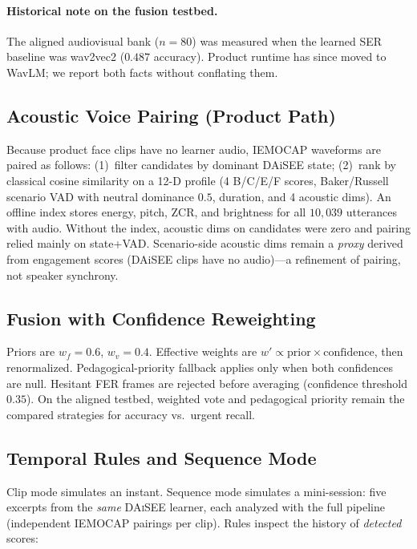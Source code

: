 \documentclass[conference]{IEEEtran}
\begin{document}
\paragraph{Historical note on the fusion testbed.}
The aligned audiovisual bank ($n{=}80$) was measured when the learned SER
baseline was wav2vec2 ($0.487$ accuracy). Product runtime has since moved to
WavLM; we report both facts without conflating them.

\subsection{Acoustic Voice Pairing (Product Path)}
\label{sec:pair}

Because product face clips have no learner audio, IEMOCAP waveforms are paired
as follows: (1)~filter candidates by dominant DAiSEE state; (2)~rank by
classical cosine similarity on a 12-D profile (4 B/C/E/F scores, Baker/Russell
scenario VAD with neutral dominance $0.5$, duration, and 4 acoustic dims). An
offline index stores energy, pitch, ZCR, and brightness for all $10{,}039$
utterances with audio. Without the index, acoustic dims on candidates were
zero and pairing relied mainly on state+VAD. Scenario-side acoustic dims remain
a \emph{proxy} derived from engagement scores (DAiSEE clips have no audio)---a
refinement of pairing, not speaker synchrony.

\subsection{Fusion with Confidence Reweighting}
\label{sec:fusion}

Priors are $w_f{=}0.6$, $w_v{=}0.4$. Effective weights are
$w' \propto \mathrm{prior}\times\mathrm{confidence}$, then renormalized.
Pedagogical-priority fallback applies only when both confidences are null.
Hesitant FER frames are rejected before averaging (confidence threshold
$0.35$). On the aligned testbed, weighted vote and pedagogical priority remain
the compared strategies for accuracy vs.\ urgent recall.

\subsection{Temporal Rules and Sequence Mode}
Clip mode simulates an instant. Sequence mode simulates a mini-session: five
excerpts from the \emph{same} \textsc{DAiSEE} learner, each analyzed with the
full pipeline (independent IEMOCAP pairings per clip). Rules inspect the
history of \emph{detected} scores:
\end{document}
